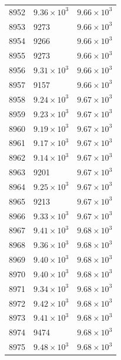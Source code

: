 \begin{table}[H]
\begin{tabular}{lll}
8952 & $\displaystyle 9.36 \times 10^{3}$ & $\displaystyle 9.66 \times 10^{3}$ \\
8953 & 9273 & $\displaystyle 9.66 \times 10^{3}$ \\
8954 & 9266 & $\displaystyle 9.66 \times 10^{3}$ \\
8955 & 9273 & $\displaystyle 9.66 \times 10^{3}$ \\
8956 & $\displaystyle 9.31 \times 10^{3}$ & $\displaystyle 9.66 \times 10^{3}$ \\
8957 & 9157 & $\displaystyle 9.66 \times 10^{3}$ \\
8958 & $\displaystyle 9.24 \times 10^{3}$ & $\displaystyle 9.67 \times 10^{3}$ \\
8959 & $\displaystyle 9.23 \times 10^{3}$ & $\displaystyle 9.67 \times 10^{3}$ \\
8960 & $\displaystyle 9.19 \times 10^{3}$ & $\displaystyle 9.67 \times 10^{3}$ \\
8961 & $\displaystyle 9.17 \times 10^{3}$ & $\displaystyle 9.67 \times 10^{3}$ \\
8962 & $\displaystyle 9.14 \times 10^{3}$ & $\displaystyle 9.67 \times 10^{3}$ \\
8963 & 9201 & $\displaystyle 9.67 \times 10^{3}$ \\
8964 & $\displaystyle 9.25 \times 10^{3}$ & $\displaystyle 9.67 \times 10^{3}$ \\
8965 & 9213 & $\displaystyle 9.67 \times 10^{3}$ \\
8966 & $\displaystyle 9.33 \times 10^{3}$ & $\displaystyle 9.67 \times 10^{3}$ \\
8967 & $\displaystyle 9.41 \times 10^{3}$ & $\displaystyle 9.68 \times 10^{3}$ \\
8968 & $\displaystyle 9.36 \times 10^{3}$ & $\displaystyle 9.68 \times 10^{3}$ \\
8969 & $\displaystyle 9.40 \times 10^{3}$ & $\displaystyle 9.68 \times 10^{3}$ \\
8970 & $\displaystyle 9.40 \times 10^{3}$ & $\displaystyle 9.68 \times 10^{3}$ \\
8971 & $\displaystyle 9.34 \times 10^{3}$ & $\displaystyle 9.68 \times 10^{3}$ \\
8972 & $\displaystyle 9.42 \times 10^{3}$ & $\displaystyle 9.68 \times 10^{3}$ \\
8973 & $\displaystyle 9.41 \times 10^{3}$ & $\displaystyle 9.68 \times 10^{3}$ \\
8974 & 9474 & $\displaystyle 9.68 \times 10^{3}$ \\
8975 & $\displaystyle 9.48 \times 10^{3}$ & $\displaystyle 9.68 \times 10^{3}$ \\

\end{tabular}
\end{table}
